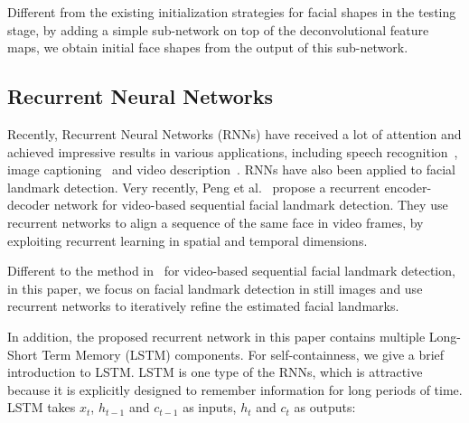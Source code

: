 \documentclass[journal]{IEEEtran}
\begin{document}
Different from the existing initialization strategies for facial shapes in the testing stage, by adding a simple sub-network on top of the deconvolutional feature maps, we obtain initial face shapes from the output of this sub-network.

\subsection{Recurrent Neural Networks}

Recently, Recurrent Neural Networks (RNNs) have received a lot of attention and achieved impressive results in various applications, including speech recognition~\cite{lstm_speech}, image captioning~\cite{showtell} and video description~\cite{videoCVPR}. RNNs have also been applied to facial landmark detection. Very recently, Peng et al.~\cite{peng2016recurrent} propose a recurrent encoder-decoder network for video-based sequential facial landmark detection. They use recurrent networks to align a sequence of the same face in video frames, by exploiting recurrent learning in spatial and temporal dimensions.


Different to the method in~\cite{peng2016recurrent} for video-based sequential facial landmark detection, in this paper, we focus on facial landmark detection in still images and use recurrent networks to iteratively refine the estimated facial landmarks.

In addition, the proposed recurrent network in this paper contains multiple Long-Short Term Memory (LSTM) components. For self-containness, we give a brief introduction to LSTM. LSTM is one type of the RNNs, which is attractive because it is explicitly designed to remember information for long periods of time. LSTM takes $x_t$, $h_{t-1}$ and $c_{t-1}$ as inputs, $h_t$ and $c_t$ as outputs:
\end{document}
